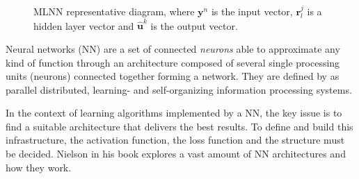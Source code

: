 \documentclass[conference]{IEEEtran}
\begin{document}
\begin{figure}[!hbp]
\centering


\caption{MLNN representative diagram, where $\textbf{y}^n$ is the input vector, $\textbf{r}_{l}^{j}$ is a hidden layer vector
and $\hat{\textbf{u}}^{k}$ is the output vector.} \label{fig:NN}
\end{figure}

Neural networks (NN) are a set of connected \textit{neurons} able to approximate any kind of function through an architecture composed of several single processing units (neurons) connected together forming a network. They are defined by \cite{Ibnkahla} as parallel distributed, learning- and self-organizing information processing systems. 

In the context of learning algorithms implemented by a NN, the key issue is to find a suitable architecture that delivers the best results. To define and build this infrastructure, the activation function, the loss function and the structure must be decided. Nielson \cite{nielsenneural} in his book explores a vast amount of NN architectures and how they work. 
\end{document}
